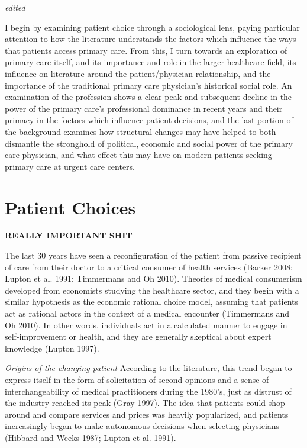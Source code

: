 \documentclass[12pt,twoside]{reedthesis}
\begin{document}
  \emph{edited}
  
  I begin by examining patient choice through a sociological lens, paying
  particular attention to how the literature understands the factors which
  influence the ways that patients access primary care. From this, I turn
  towards an exploration of primary care itself, and its importance and
  role in the larger healthcare field, its influence on literature around
  the patient/physician relationship, and the importance of the
  traditional primary care physician's historical social role. An
  examination of the profession shows a clear peak and subsequent decline
  in the power of the primary care's professional dominance in recent
  years and their primacy in the foctors which influence patient
  decisions, and the last portion of the background examines how
  structural changes may have helped to both dismantle the stronghold of
  political, economic and social power of the primary care physician, and
  what effect this may have on modern patients seeking primary care at
  urgent care centers.
  
  \section*{Patient Choices}\label{patient-choices}
  
  \textbf{REALLY IMPORTANT SHIT}
  
  The last 30 years have seen a reconfiguration of the patient from
  passive recipient of care from their doctor to a critical consumer of
  health services (Barker 2008; Lupton et al. 1991; Timmermans and Oh
  2010). Theories of medical consumerism developed from economists
  studying the healthcare sector, and they begin with a similar hypothesis
  as the economic rational choice model, assuming that patients act as
  rational actors in the context of a medical encounter (Timmermans and Oh
  2010). In other words, individuals act in a calculated manner to engage
  in self-improvement or health, and they are generally skeptical about
  expert knowledge (Lupton 1997).
  
  \emph{Origins of the changing patient} According to the literature, this
  trend began to express itself in the form of solicitation of second
  opinions and a sense of interchangeability of medical practitioners
  during the 1980's, just as distrust of the industry reached its peak
  (Gray 1997). The idea that patients could shop around and compare
  services and prices was heavily popularized, and patients increasingly
  began to make autonomous decisions when selecting physicians (Hibbard
  and Weeks 1987; Lupton et al. 1991).
  
\end{document}
